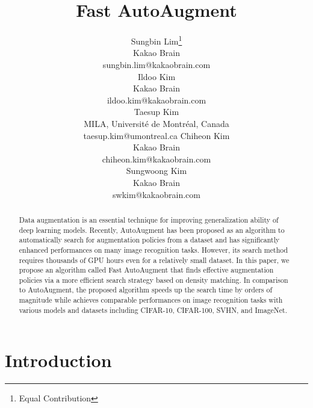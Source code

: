 \documentclass{article}
\newcommand{\cmtt}[1]{{\fontfamily{cmtt}\selectfont #1}}
\begin{document}
\title{Fast AutoAugment}


\author{
    Sungbin Lim\thanks{Equal Contribution} \\
    Kakao Brain \\
    \cmtt{sungbin.lim@kakaobrain.com} \\
    \And
    Ildoo Kim\footnotemark[1] \\
    Kakao Brain \\
    \cmtt{ildoo.kim@kakaobrain.com} \\
    \And
    Taesup Kim \\
    MILA, Universit\'e de Montr\'eal, Canada \\
    \cmtt{taesup.kim@umontreal.ca}    
    \And
    Chiheon Kim \\
    Kakao Brain \\
    \cmtt{chiheon.kim@kakaobrain.com} \\
    \And
    Sungwoong Kim \\
    Kakao Brain \\
    \cmtt{swkim@kakaobrain.com} \\
}

\maketitle




\begin{abstract}
Data augmentation is an essential technique for improving generalization ability of deep learning models. Recently, AutoAugment \cite{cubuk2018autoaugment} has been proposed as an algorithm to automatically search for augmentation policies from a dataset and has significantly enhanced performances on many image recognition tasks. However, its search method requires thousands of GPU hours even for a relatively small dataset. In this paper, we propose an algorithm called Fast AutoAugment that finds effective augmentation policies via a more efficient search strategy based on density matching. In comparison to AutoAugment, the proposed algorithm speeds up the search time by orders of magnitude while achieves comparable performances on image recognition tasks with various models and datasets including CIFAR-10, CIFAR-100, SVHN, and ImageNet.
\end{abstract}

\section{Introduction}
\end{document}
